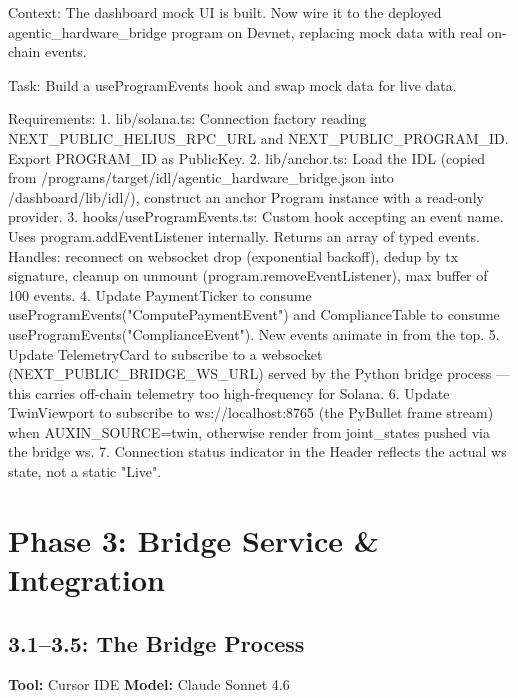 \documentclass[11pt, a4paper]{article}
\begin{document}
\begin{promptbox}
Context: The dashboard mock UI is built. Now wire it to the deployed agentic_hardware_bridge program on Devnet, replacing mock data with real on-chain events.

Task: Build a useProgramEvents hook and swap mock data for live data.

Requirements:
1. lib/solana.ts: Connection factory reading NEXT_PUBLIC_HELIUS_RPC_URL and NEXT_PUBLIC_PROGRAM_ID. Export PROGRAM_ID as PublicKey.
2. lib/anchor.ts: Load the IDL (copied from /programs/target/idl/agentic_hardware_bridge.json into /dashboard/lib/idl/), construct an anchor Program instance with a read-only provider.
3. hooks/useProgramEvents.ts: Custom hook accepting an event name. Uses program.addEventListener internally. Returns an array of typed events. Handles: reconnect on websocket drop (exponential backoff), dedup by tx signature, cleanup on unmount (program.removeEventListener), max buffer of 100 events.
4. Update PaymentTicker to consume useProgramEvents("ComputePaymentEvent") and ComplianceTable to consume useProgramEvents("ComplianceEvent"). New events animate in from the top.
5. Update TelemetryCard to subscribe to a websocket (NEXT_PUBLIC_BRIDGE_WS_URL) served by the Python bridge process --- this carries off-chain telemetry too high-frequency for Solana.
6. Update TwinViewport to subscribe to ws://localhost:8765 (the PyBullet frame stream) when AUXIN_SOURCE=twin, otherwise render from joint_states pushed via the bridge ws.
7. Connection status indicator in the Header reflects the actual ws state, not a static "Live".
\end{promptbox}

\section{Phase 3: Bridge Service \& Integration}

\subsection*{3.1--3.5: The Bridge Process}
\textbf{Tool:} Cursor IDE \quad \textbf{Model:} Claude Sonnet 4.6
\end{document}
